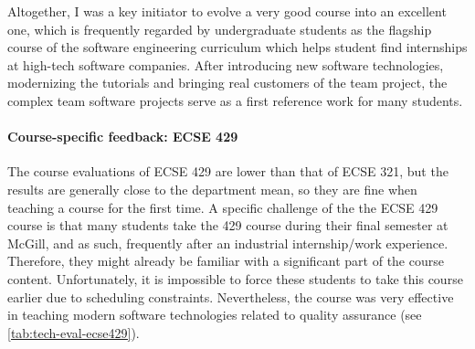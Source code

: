 \documentclass[a4paper,11pt]{report}
\begin{document}
Altogether, I was a key initiator to evolve a very good course into an excellent one, which is frequently regarded by undergraduate students as the flagship course of the software engineering curriculum which helps student find internships at high-tech software companies. After introducing new software technologies, modernizing the tutorials and bringing real customers of the team project, the complex team software projects serve as a first reference work for many students. 

\paragraph{Course-specific feedback: ECSE 429}
The course evaluations of ECSE 429 are lower than that of ECSE 321, but the results are generally close to the department 
mean, so they are fine when teaching a course for the first time.  A specific challenge of the the ECSE 429 course is that 
many students take the 429 course during their final semester at McGill, and as such, frequently after an industrial 
internship/work experience. Therefore, they might already be familiar with a significant part of the course content. 
Unfortunately, it is impossible to force these students to take this course earlier due to scheduling constraints. Nevertheless, 
the course was very effective in teaching modern software technologies related to quality assurance (see \autoref{tab:tech-eval-ecse429}).


%
%
%
\end{document}
